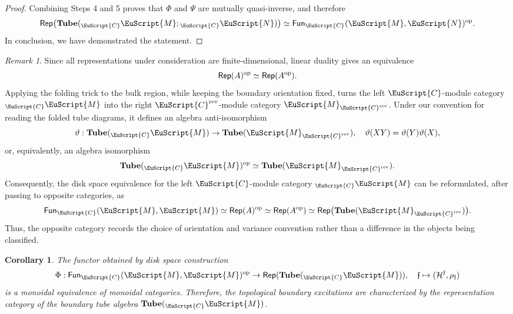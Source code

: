 \documentclass[a4paper,11pt]{article}
\newtheorem{corollary}[theorem]{Corollary}
\theoremstyle{definition}
\theoremstyle{remark}
\newtheorem{remark}[theorem]{Remark}
\newcommand\eC           {\EuScript{C}}
\newcommand\eM          {\EuScript{M}}
\newcommand\eN         {\EuScript{N}}
\newcommand{\Rep}{\mathsf{Rep}}
\newcommand{\Tube}{\mathbf{Tube}}
\newcommand{\Fun}{\mathsf{Fun}}
\begin{document}
\begin{proof}
Combining Steps 4 and 5 proves that $\Phi$ and $\Psi$ are mutually quasi-inverse, and therefore
\begin{equation}
    \notag
    \Rep\bigl(\mathbf{Tube}({}_{\eC}\eM;{}_{\eC}\eN)\bigr)
    \simeq
    \Fun_{\eC}(\eM,\eN)^{\rm op}.
\end{equation}
In conclusion, we have demonstrated the statement. 
\end{proof}


\begin{remark}
    Since all representations under consideration are finite-dimensional, linear duality gives an equivalence
    \begin{equation}
        \notag
        \Rep(A)^{\mathrm{op}}
        \simeq
        \Rep(A^{\mathrm{op}}).
    \end{equation}
    Applying the folding trick to the bulk region, while keeping the boundary orientation fixed, turns the left $\eC$-module category ${}_{\eC}\eM$ into the right $\eC^{\rm rev}$-module category $\eM_{\eC^{\rm rev}}$. Under our convention for reading the folded tube diagrams, it defines an algebra anti-isomorphism
    \begin{equation}
        \notag
        \vartheta:
        \mathbf{Tube}({}_{\eC}\eM)
        \to
        \mathbf{Tube}(\eM_{\eC^{\mathrm{rev}}}),
        \quad
        \vartheta(XY)=\vartheta(Y)\vartheta(X),
    \end{equation}
    or, equivalently, an algebra isomorphism
    \begin{equation}
        \notag
        \mathbf{Tube}({}_{\eC}\eM)^{\mathrm{op}}
        \simeq
        \mathbf{Tube}(\eM_{\eC^{\mathrm{rev}}}).
    \end{equation}
    Consequently, the disk space equivalence for the left $\eC$-module category ${}_{\eC}\eM$ can be reformulated, after passing to opposite categories, as
    \begin{equation}
        \notag
        \Fun_{\eC}(\eM,\eM)
        \simeq
        \Rep(A)^{\mathrm{op}}
        \simeq
        \Rep(A^{\mathrm{op}})
        \simeq
        \Rep\bigl(
            \mathbf{Tube}(\eM_{\eC^{\mathrm{rev}}})
        \bigr).
    \end{equation}
    Thus, the opposite category records the choice of orientation and variance convention rather than a difference in the objects being classified.
\end{remark}

\begin{corollary}
    The functor obtained by disk space construction  
    \begin{equation}
        \Phi:\Fun_{\eC}(\eM,\eM)^{\rm op} \to \Rep(\Tube({}_\eC\eM)),\quad \mathfrak{f}\mapsto (\mathcal{H}^\mathfrak{f},\rho_\mathfrak{f}) 
    \end{equation}
    is a monoidal equivalence of monoidal categories. Therefore, the topological boundary excitations are characterized by the representation category of the boundary tube algebra $\Tube({}_\eC\eM)$. 
\end{corollary}
\end{document}
